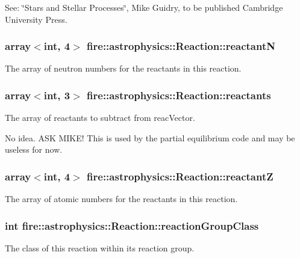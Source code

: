 See\+: \char`\"{}\+Stars and Stellar Processes\char`\"{}, Mike Guidry, to be published Cambridge University Press. 
\subsubsection[{\texorpdfstring{reactantN}{reactantN}}]{\setlength{\rightskip}{0pt plus 5cm}array$<$int, 4$>$ fire\+::astrophysics\+::\+Reaction\+::reactantN}\hypertarget{a00242_a831dcae79d4ed842c9bbdf51ebdd137f}{}\label{a00242_a831dcae79d4ed842c9bbdf51ebdd137f}
The array of neutron numbers for the reactants in this reaction. 
\subsubsection[{\texorpdfstring{reactants}{reactants}}]{\setlength{\rightskip}{0pt plus 5cm}array$<$int, 3$>$ fire\+::astrophysics\+::\+Reaction\+::reactants}\hypertarget{a00242_ab13b0133b89c6531a1648b696324d804}{}\label{a00242_ab13b0133b89c6531a1648b696324d804}
The array of reactants to subtract from reac\+Vector.

No idea. A\+SK M\+I\+K\+E! This is used by the partial equilibrium code and may be useless for now. 
\subsubsection[{\texorpdfstring{reactantZ}{reactantZ}}]{\setlength{\rightskip}{0pt plus 5cm}array$<$int, 4$>$ fire\+::astrophysics\+::\+Reaction\+::reactantZ}\hypertarget{a00242_a74b96d4f5ff99d60adfb88b096a7e256}{}\label{a00242_a74b96d4f5ff99d60adfb88b096a7e256}
The array of atomic numbers for the reactants in this reaction. 
\subsubsection[{\texorpdfstring{reaction\+Group\+Class}{reactionGroupClass}}]{\setlength{\rightskip}{0pt plus 5cm}int fire\+::astrophysics\+::\+Reaction\+::reaction\+Group\+Class}\hypertarget{a00242_ab6d29b5c28ef33ea1d9219b70f02d98a}{}\label{a00242_ab6d29b5c28ef33ea1d9219b70f02d98a}
The class of this reaction within its reaction group. 
